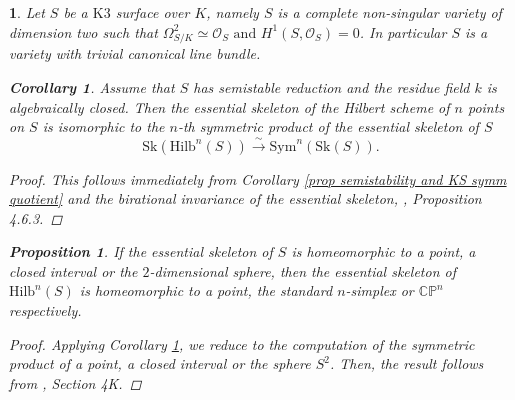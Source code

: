 \documentclass{amsart}%
\numberwithin{equation}{subsection}
\theoremstyle{plain2}
\newtheorem{cor}[equation]{Corollary}
\newtheorem{prop}[equation]{Proposition}
\theoremstyle{definition2}
\theoremstyle{stepstyle}
\theoremstyle{point}
\theoremstyle{subpoint}
\newtheorem{subpoint}[equation]{}%
\newcommand{\spa}[1]{\begin{subpoint}#1\end{subpoint}}           %
\newcommand{\CP}{\ensuremath{\mathbb{CP}}}
\newcommand{\caO}{\ensuremath{\mathcal{O}}}
\newcommand{\Hilb}{\ensuremath{\mathrm{Hilb}}}
\newcommand{\Sk}{\mathrm{Sk}}
\begin{document}
\spa{Let $S$ be a $\text{K}3$ surface over $K$, namely $S$ is a complete non-singular variety of dimension two such that $\Omega_{S/K}^2 \simeq \caO_S \text{ and } H^1(S,\caO_S) = 0$. In particular $S$ is a variety with trivial canonical line bundle. 
\begin{cor}  \label{cor essential skeleton hilb}
Assume that $S$ has  semistable reduction and the residue field $k$ is algebraically closed. Then the essential skeleton of the Hilbert scheme of $n$ points on $S$ is isomorphic to the $n$-th symmetric product of the essential skeleton of $S$ $$\Sk(\Hilb^n(S)) \xrightarrow{\sim} \text{Sym}^n(\Sk(S)).$$ 
\end{cor}
\begin{proof}
This follows immediately from Corollary \ref{prop semistability and KS symm quotient} and the birational invariance of the essential skeleton, \cite{MustataNicaise}, Proposition 4.6.3.
\end{proof}
\begin{prop} \label{prop top essential skeleton Hilb}
If the essential skeleton of $S$ is homeomorphic to a point, a closed interval or the $2$-dimensional sphere, then the essential skeleton of $\Hilb^n(S)$ is homeomorphic to a point, the standard $n$-simplex or $\CP^n$ respectively. 
\end{prop}
\begin{proof} Applying Corollary \ref{cor essential skeleton hilb}, we reduce to the computation of the symmetric product of a point, a closed interval or the sphere $S^2$. Then, the result follows from \cite{Hatcher}, Section 4K.
\end{proof}

}
\end{document}
